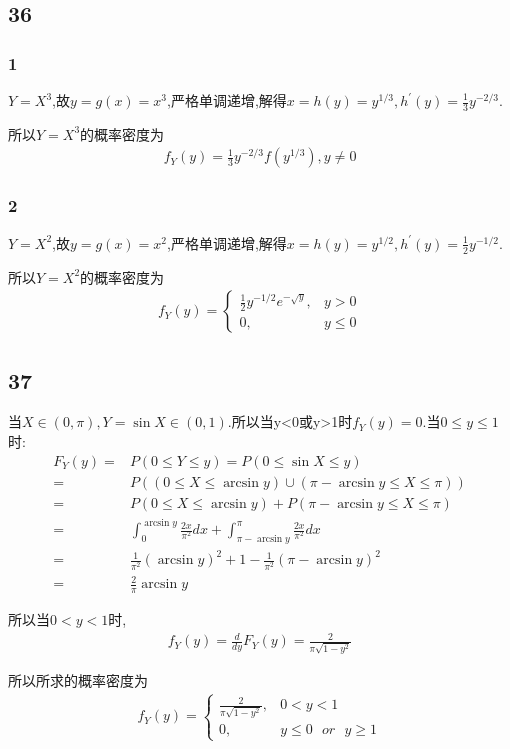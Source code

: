 \documentclass[12pt,a4paper,fontset=none]{ctexart}
\begin{document}
\subsection*{36}
\subsubsection*{1}
$Y=X^3$,故$y=g(x)=x^3$,严格单调递增,解得$x=h(y)=y^{1/3},h^{\prime} (y)=\frac{1}{3}y^{-2/3} $.

所以$Y=X^3$的概率密度为
\begin{align*}
    f_Y(y)=\frac{1}{3}y^{-2/3}f(y^{1/3}),y\neq 0
\end{align*}
\subsubsection*{2}
$Y=X^2$,故$y=g(x)=x^2$,严格单调递增,解得$x=h(y)=y^{1/2},h^{\prime} (y)=\frac{1}{2}y^{-1/2} $.

所以$Y=X^2$的概率密度为
\begin{align*}
    f_Y(y)=
    \begin{cases}
        \frac{1}{2}y^{-1/2}e^{-\sqrt{y}}, & y>0     \\
        0,                                & y\leq 0
    \end{cases}
\end{align*}
\subsection*{37}
当$X\in (0,\pi),Y=\sin X\in(0,1)$.所以当y<0或y>1时$f_Y(y)=0$.当$0\leq y\leq 1$时:
\begin{align*}
    F_Y(y)= & P(0\leq Y\leq y)=P(0\leq \sin X\leq y)        \\=&P((0\leq X\leq \arcsin y)\cup (\pi-\arcsin y\leq X\leq \pi))\\=&
    P(0\leq X\leq \arcsin y)+P(\pi-\arcsin y\leq X\leq \pi) \\=&\int_{0}^{\arcsin y}\frac{2x}{\pi^2} dx+\int_{\pi-\arcsin y}^{\pi}\frac{2x}{\pi^2} dx\\=&\frac{1}{\pi^2} (\arcsin y)^2+1-\frac{1}{\pi^2} (\pi-\arcsin y)^2\\=&\frac{2}{\pi} \arcsin y
\end{align*}

所以当$0<y<1$时,
\begin{align*}
    f_Y(y)=\frac{d}{dy} F_Y(y)=\frac{2}{\pi\sqrt{1-y^2}}
\end{align*}

所以所求的概率密度为
\begin{align*}
    f_Y(y)=
    \begin{cases}
        \frac{2}{\pi\sqrt{1-y^2}}, & 0<y<1                            \\
        0,                         & y\leq 0\text{ }or\text{ }y\geq 1
    \end{cases}
\end{align*}
\end{document}
